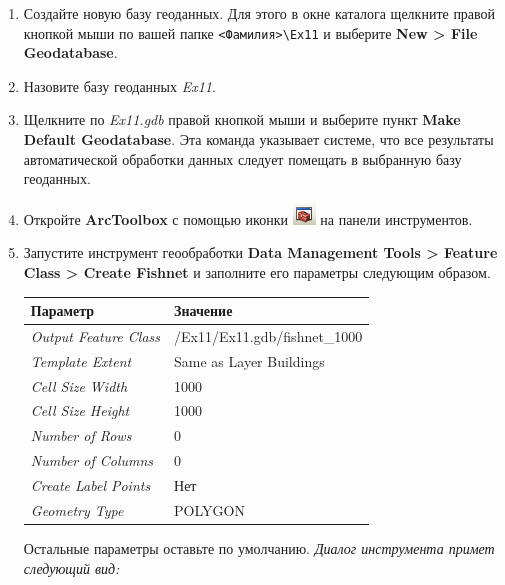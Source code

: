 \documentclass[]{book}
\theoremstyle{definition}
\theoremstyle{definition}
\theoremstyle{definition}
\theoremstyle{remark}
\begin{document}
\begin{enumerate}
\def\labelenumi{\arabic{enumi}.}
\item
  Создайте новую базу геоданных. Для этого в окне каталога щелкните
  правой кнопкой мыши по вашей папке
  \texttt{\textless{}Фамилия\textgreater{}\textbackslash{}Ex11} и
  выберите \textbf{New \textgreater{} File Geodatabase}.
\item
  Назовите базу геоданных \emph{Ex11}.
\item
  Щелкните по \emph{Ex11.gdb} правой кнопкой мыши и выберите пункт
  \textbf{Make Default Geodatabase}. Эта команда указывает системе, что
  все результаты автоматической обработки данных следует помещать в
  выбранную базу геоданных.
\item
  Откройте \textbf{ArcToolbox} с помощью иконки
  \includegraphics{images/Ex11/image7.png} на панели инструментов.
\item
  Запустите инструмент геообработки \textbf{Data Management Tools
  \textgreater{} Feature Class \textgreater{} Create Fishnet} и
  заполните его параметры следующим образом.

  \begin{longtable}[]{@{}ll@{}}
  \toprule
  Параметр & Значение\tabularnewline
  \midrule
  \endhead
  \emph{Output Feature Class} &
  /Ex11/Ex11.gdb/fishnet\_1000\tabularnewline
  \emph{Template Extent} & Same as Layer Buildings\tabularnewline
  \emph{Cell Size Width} & 1000\tabularnewline
  \emph{Cell Size Height} & 1000\tabularnewline
  \emph{Number of Rows} & 0\tabularnewline
  \emph{Number of Columns} & 0\tabularnewline
  \emph{Create Label Points} & Нет\tabularnewline
  \emph{Geometry Type} & POLYGON\tabularnewline
  \bottomrule
  \end{longtable}

  Остальные параметры оставьте по умолчанию. \emph{Диалог инструмента
  примет следующий вид:}


\end{enumerate}
\end{document}
